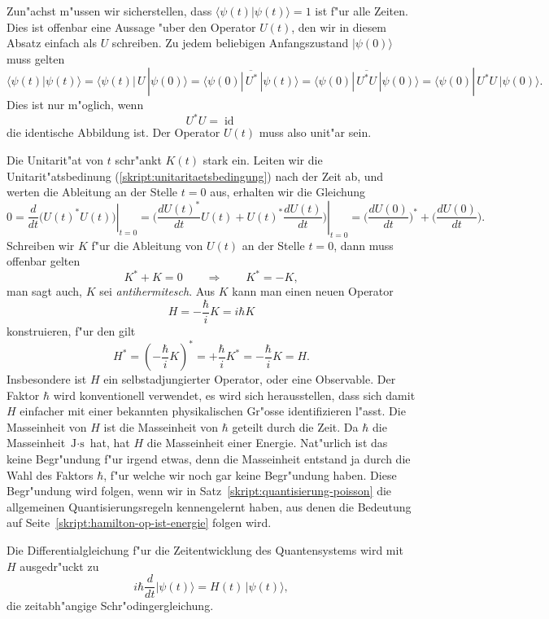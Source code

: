 Zun"achst m"ussen wir sicherstellen, dass $\langle\psi(t)|\psi(t)\rangle=1$
ist f"ur alle Zeiten. Dies ist offenbar eine Aussage "uber den Operator $U(t)$,
den wir in diesem Absatz einfach als $U$ schreiben.
Zu jedem beliebigen Anfangszustand $|\psi(0)\rangle$ muss gelten
\[
\langle \psi(t)|\psi(t)\rangle
=
\langle \psi(t)|\,U\,|\psi(0)\rangle
=
\overline{\langle\psi(0)|\,U^*\,|\psi(t)\rangle}
=
\overline{\langle\psi(0)|\,U^*U\,|\psi(0)\rangle}
=
\langle\psi(0)|\,U^*U\,|\psi(0)\rangle.
\]
Dies ist nur m"oglich, wenn
\begin{equation}
U^*U=\operatorname{id}
\label{skript:unitaritaetsbedingung}
\end{equation}
die identische Abbildung ist. Der Operator $U(t)$ muss also unit"ar sein.

Die Unitarit"at von $t$ schr"ankt $K(t)$ stark ein. Leiten wir die
Unitarit"atsbedinung (\ref{skript:unitaritaetsbedingung}) nach der Zeit ab,
und werten die Ableitung an der Stelle $t=0$ aus,
erhalten wir die Gleichung
\[
0
=
\left.\frac{d}{dt}\bigl(U(t)^*U(t)\bigr)\right|_{t=0}
=
\left.
\biggl(
\frac{dU(t)^*}{dt}U(t)+U(t)^*\frac{dU(t)}{dt}
\biggr)
\right|_{t=0}
=
\biggl(\frac{dU(0)}{dt}\biggr)^*
+
\biggl(\frac{dU(0)}{dt}\biggr).
\]
Schreiben wir $K$ f"ur die Ableitung von $U(t)$ an der Stelle $t=0$,
dann muss offenbar gelten
\[
K^*+K=0\qquad\Rightarrow\qquad K^*=-K,
\]
man sagt auch, $K$ sei {\em antihermitesch}. Aus $K$ kann man einen
neuen Operator
\[
H=-\frac{\hbar}{i}K=i\hbar K
\]
konstruieren, f"ur den gilt
\[
H^*
=
\left(-\frac{\hbar}{i}K\right)^*
=
+\frac{\hbar}{i}K^*
=
-\frac{\hbar}{i}K=H.
\]
Insbesondere ist $H$ ein selbstadjungierter Operator, oder
eine Observable.
Der Faktor $\hbar$ wird konventionell verwendet, es wird sich
herausstellen, dass sich damit $H$ einfacher mit einer bekannten
physikalischen Gr"osse identifizieren l"asst.
Die Masseinheit von $H$ ist die Masseinheit von $\hbar$ geteilt durch die Zeit.
Da $\hbar$ die Masseinheit $\text{J}\cdot\text{s}$ hat, hat
$H$ die Masseinheit einer Energie.
Nat"urlich ist das keine Begr"undung f"ur irgend etwas, denn die
Masseinheit entstand ja durch die Wahl des Faktors $\hbar$, f"ur
welche wir noch gar keine Begr"undung haben.
Diese Begr"undung wird folgen, wenn wir in
Satz~\ref{skript:quantisierung-poisson}
die allgemeinen Quantisierungsregeln kennengelernt haben, aus
denen die Bedeutung auf Seite~\ref{skript:hamilton-op-ist-energie}
folgen wird.

Die Differentialgleichung f"ur die Zeitentwicklung des Quantensystems wird
mit $H$ ausgedr"uckt zu
\begin{equation}
i\hbar\frac{d}{dt}|\psi(t)\rangle = H(t)\,|\psi(t)\rangle,
\label{skript:schroedingergleichungt}
\end{equation}
die {\rm zeitabh"angige Schr"odingergleichung}.

